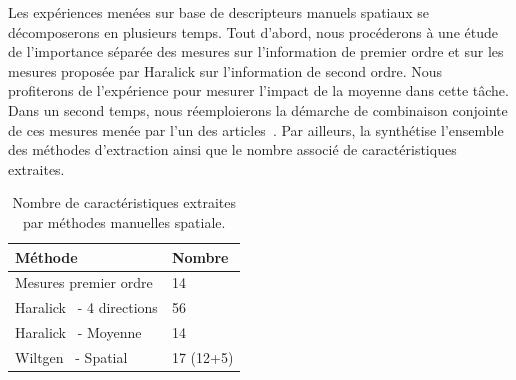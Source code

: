 Les expériences menées sur base de descripteurs manuels spatiaux se décomposerons en plusieurs temps. Tout d'abord, nous procéderons à une étude de l'importance séparée des mesures sur l'information de premier ordre et sur les mesures proposée par Haralick sur l'information de second ordre. Nous profiterons de l'expérience pour mesurer l'impact de la moyenne dans cette tâche. Dans un second temps, nous réemploierons la démarche de combinaison conjointe de ces mesures menée par l'un des articles~\cite{Wiltgen2008}. Par ailleurs, la  synthétise l'ensemble des méthodes d'extraction ainsi que le nombre associé de caractéristiques extraites.\par
\begin{table}[h]
    \centering
    \begin{tabular*}{0.6\linewidth}{l@{\extracolsep{\fill}}l}
        \toprule
        \textbf{Méthode}                            & \textbf{Nombre}   \\ \hline
        Mesures premier ordre                       & 14                \\ \hline
        Haralick~\cite{Haralick1973} - 4 directions & 56                \\ \hline
        Haralick~\cite{Haralick1973} - Moyenne      & 14                \\ \hline
        Wiltgen~\cite{Wiltgen2008} - Spatial        & 17 (12+5)         \\
        \bottomrule
    \end{tabular*}
    \caption{Nombre de caractéristiques extraites par méthodes manuelles spatiale.}
    \label{tab:number_features_spatial}
\end{table}

